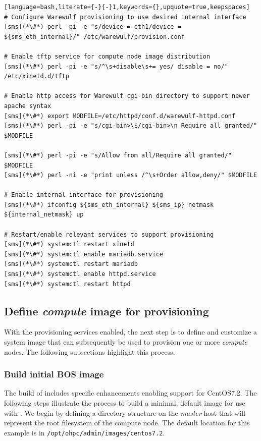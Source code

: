 \documentclass[letterpaper]{article}
\newcommand{\baseOS}{CentOS7.2}
\newcommand{\baseos}{centos7.2}
\begin{document}
\begin{lstlisting}[language=bash,literate={-}{-}1,keywords={},upquote=true,keepspaces]
# Configure Warewulf provisioning to use desired internal interface
[sms](*\#*) perl -pi -e "s/device = eth1/device = ${sms_eth_internal}/" /etc/warewulf/provision.conf

# Enable tftp service for compute node image distribution
[sms](*\#*) perl -pi -e "s/^\s+disable\s+= yes/ disable = no/" /etc/xinetd.d/tftp

# Enable http access for Warewulf cgi-bin directory to support newer apache syntax
[sms](*\#*) export MODFILE=/etc/httpd/conf.d/warewulf-httpd.conf
[sms](*\#*) perl -pi -e "s/cgi-bin>\$/cgi-bin>\n Require all granted/" $MODFILE

[sms](*\#*) perl -pi -e "s/Allow from all/Require all granted/" $MODFILE
[sms](*\#*) perl -ni -e "print unless /^\s+Order allow,deny/" $MODFILE

# Enable internal interface for provisioning
[sms](*\#*) ifconfig ${sms_eth_internal} ${sms_ip} netmask ${internal_netmask} up

# Restart/enable relevant services to support provisioning
[sms](*\#*) systemctl restart xinetd
[sms](*\#*) systemctl enable mariadb.service
[sms](*\#*) systemctl restart mariadb
[sms](*\#*) systemctl enable httpd.service
[sms](*\#*) systemctl restart httpd
\end{lstlisting}


\subsection{Define {\em compute} image for provisioning}

With the provisioning services enabled, the next step is to define and
customize a system image that can subsequently be used to provision one or more
{\em compute} nodes. The following subsections highlight this process.

\subsubsection{Build initial BOS image} \label{sec:assemble_bos}

The \OHPC{} build of \Warewulf{} includes specific enhancements enabling support for
\baseOS{}. The following steps illustrate the process to build a minimal, default
image for use with \Warewulf{}. We begin by defining a directory structure on the 
{\em master} host that will represent the root filesystem of the compute node. The 
default location for this example is in
\texttt{/opt/ohpc/admin/images/\baseos{}}.
\end{document}
